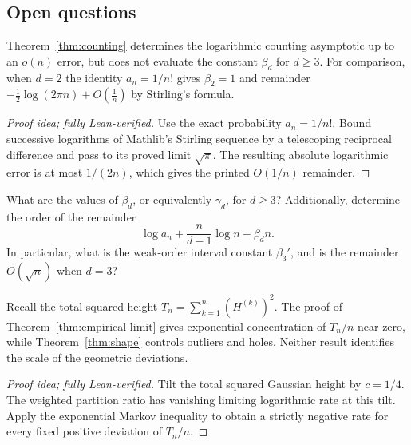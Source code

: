 \documentclass[11pt,letterpaper]{article}
\begin{document}
\subsection{Open questions}


Theorem~\ref{thm:counting} determines the logarithmic counting asymptotic up to an $o(n)$ error, but does not evaluate the constant $\beta_d$ for $d\ge3$. For comparison, when $d=2$ the identity $a_n=1/n!$ gives $\beta_2=1$ and remainder $-\frac12\log(2\pi n)+O(\frac1n)$ by Stirling's formula.

\begin{proof}[Proof idea; fully Lean-verified]
Use the exact probability $a_n=1/n!$. Bound successive logarithms of Mathlib's Stirling sequence by a telescoping reciprocal difference and pass to its proved limit $\sqrt\pi$. The resulting absolute logarithmic error is at most $1/(2n)$, which gives the printed $O(1/n)$ remainder.
\end{proof}


\begin{question}\label{ques:constant}
            What are the values of $\beta_d$, or equivalently $\gamma_d$, for $d\ge3$? Additionally, determine the order of the remainder
            \[
                  \log a_n+\frac{n}{d-1}\log n-\beta_dn.
            \]
            In particular, what is the weak-order interval constant $\beta_3'$, and is the remainder $O(\sqrt n)$ when $d=3$?
      \end{question}


Recall the total squared height $T_n=\sum_{k=1}^n(H^{(k)})^2$. The proof of Theorem~\ref{thm:empirical-limit} gives exponential concentration of $T_n/n$ near zero, while Theorem~\ref{thm:shape} controls outliers and holes. Neither result identifies the scale of the geometric deviations.

\begin{proof}[Proof idea; fully Lean-verified]
Tilt the total squared Gaussian height by $c=1/4$. The weighted partition ratio has vanishing limiting logarithmic rate at this tilt. Apply the exponential Markov inequality to obtain a strictly negative rate for every fixed positive deviation of $T_n/n$.
\end{proof}
\end{document}
